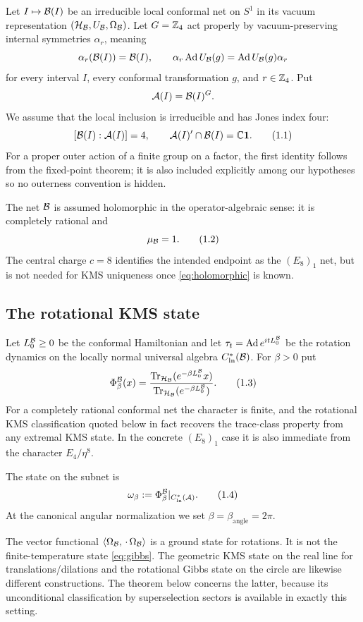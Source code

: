Let $I\mapsto\mathcal B(I)$ be an irreducible local conformal net on $S^1$ in
its vacuum representation $(\mathcal H_{\mathcal B},U_{\mathcal B},\Omega_{\mathcal B})$.  Let
$G=\mathbb Z_4$ act properly by vacuum-preserving internal symmetries
$\alpha_r$, meaning
\[
 \alpha_r(\mathcal B(I))=\mathcal B(I),\qquad
 \alpha_r\operatorname{Ad} U_{\mathcal B}(g)=\operatorname{Ad} U_{\mathcal B}(g)\alpha_r
\]
for every interval $I$, every conformal transformation $g$, and
$r\in\mathbb Z_4$.  Put
\[
 \mathcal A(I)=\mathcal B(I)^G.
\]
We assume that the local inclusion is irreducible and has Jones index
four:
\[
 [\mathcal B(I):\mathcal A(I)]=4,\qquad
 \mathcal A(I)'\cap\mathcal B(I)=\mathbb C\mathbf 1.
\tag{1.1}\label{eq:local-inclusion}
\]
For a proper outer action of a finite group on a factor, the first
identity follows from the fixed-point theorem; it is also included
explicitly among our hypotheses so no outerness convention is hidden.

The net $\mathcal B$ is assumed holomorphic in the operator-algebraic sense:
it is completely rational and
\[
 \mu_{\mathcal B}=1.
\tag{1.2}\label{eq:holomorphic}
\]
The central charge $c=8$ identifies the intended endpoint as the
$(E_8)_1$ net, but is not needed for KMS uniqueness once
\eqref{eq:holomorphic} is known.

\subsection{The rotational KMS state}

Let $L_0^{\mathcal B}\geq0$ be the conformal Hamiltonian and let
$\tau_t=\operatorname{Ad} e^{itL_0^{\mathcal B}}$ be the rotation dynamics on the locally
normal universal algebra $C^*_{\mathrm{ln}}(\mathcal B)$.  For $\beta>0$ put
\[
 \Phi_\beta^{\mathcal B}(x)
 =\frac{\operatorname{Tr}_{\mathcal H_{\mathcal B}}(e^{-\beta L_0^{\mathcal B}}x)}
 {\operatorname{Tr}_{\mathcal H_{\mathcal B}}(e^{-\beta L_0^{\mathcal B}})}.
\tag{1.3}\label{eq:gibbs}
\]
For a completely rational conformal net the character is finite, and
the rotational KMS classification quoted below in fact recovers the
trace-class property from any extremal KMS state.  In the concrete
$(E_8)_1$ case it is also immediate from the character
$E_4/\eta^8$.

\begin{definition}
\label{def:geometric}
The state on the subnet is
\[
 \omega_\beta:=\Phi_\beta^{\mathcal B}|_{C^*_{\mathrm{ln}}(\mathcal A)}.
\tag{1.4}\label{eq:omega-def}
\]
At the canonical angular normalization we set
$\beta=\beta_{\mathrm{angle}}=2\pi$.
\end{definition}

\begin{remark}
The vector functional
$\langle\Omega_{\mathcal B},\,\cdot\,\Omega_{\mathcal B}\rangle$ is a ground state for
rotations.  It is not the finite-temperature state
\eqref{eq:gibbs}.  The geometric KMS state on the real line for
translations/dilations and the rotational Gibbs state on the circle
are likewise different constructions.  The theorem below concerns
the latter, because its unconditional classification by
superselection sectors is available in exactly this setting.
\end{remark}

